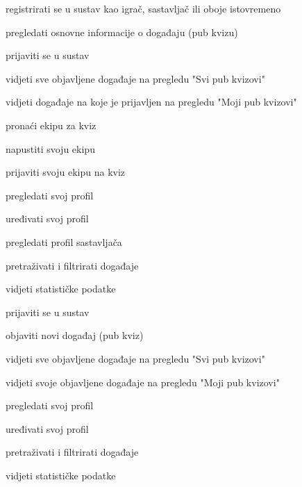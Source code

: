 			
			\begin{packed_enum}
				\item  {}
				
				\begin{packed_enum}
					
					\item registrirati se u sustav kao igrač, sastavljač ili oboje istovremeno
					\item pregledati osnovne informacije o događaju (pub kvizu)
					
				\end{packed_enum}
			
				\item  {}
				
				\begin{packed_enum}
					
					\item prijaviti se u sustav
					\item vidjeti sve objavljene događaje na pregledu "Svi pub kvizovi"
					\item vidjeti događaje na koje je prijavljen na pregledu "Moji pub kvizovi"
					\item pronaći ekipu za kviz
					\item napustiti svoju ekipu
					\item prijaviti svoju ekipu na kviz					
					\item pregledati svoj profil
					\item uređivati svoj profil
					\item pregledati profil sastavljača					 
					\item pretraživati i filtrirati događaje
					\item vidjeti statističke podatke				
							
				\end{packed_enum}
			
				\item  {}
				
				\begin{packed_enum}
					
					\item prijaviti se u sustav
					\item objaviti novi događaj (pub kviz)
					\item vidjeti sve objavljene događaje na pregledu "Svi pub kvizovi"
					\item vidjeti svoje objavljene događaje na pregledu "Moji pub kvizovi"				
					\item pregledati svoj profil
					\item uređivati svoj profil							 
					\item pretraživati i filtrirati događaje
					\item vidjeti statističke podatke	
					

\end{packed_enum}
\end{packed_enum}
